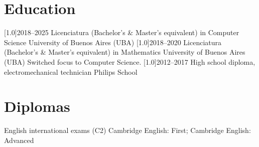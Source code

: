 \documentclass{cv-style}     %
\begin{document}
\section{Education}
  \vspace{-0.2cm}
\begin{entrylist}
\entry
{\scalebox{.8}[1.0]{2018--2025}}
{Licenciatura (Bachelor's \& Master's equivalent) in Computer Science}
{University of Buenos Aires (UBA)}
{}
\entry
{\scalebox{.8}[1.0]{2018--2020}}
{Licenciatura (Bachelor's \& Master's equivalent) in Mathematics}
{University of Buenos Aires (UBA)}
{Switched focus to Computer Science.}
\entry
{\scalebox{.8}[1.0]{2012--2017}}
{High school diploma, electromechanical technician}
{Philips School}
{}
\end{entrylist}
\section{Diplomas}
   \vspace{-0.2cm}
\begin{entrylist}
\entry
{}
{English international exams (C2)}
{}
{Cambridge English: First; Cambridge English: Advanced}
\end{entrylist}
  \vspace{-0.2cm}
\end{document}
